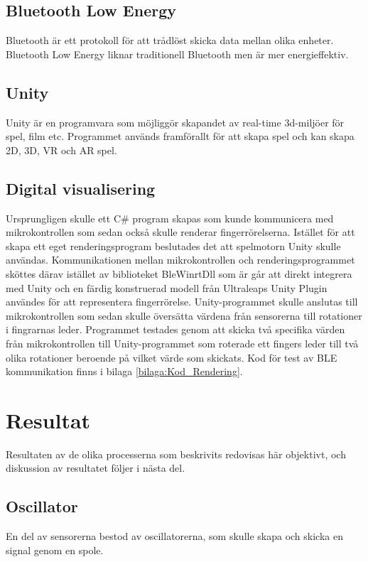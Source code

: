 \documentclass[a4paper]{article}
\begin{document}
\begin{sloppypar}
    \subsection{Bluetooth Low Energy}
    Bluetooth är ett protokoll för att trådlöst skicka data mellan olika enheter. Bluetooth Low Energy liknar traditionell Bluetooth men är mer energieffektiv.~\cite{Bluetooth}

    \subsection{Unity}
    Unity är en programvara som möjliggör skapandet av real-time 3d-miljöer för spel, film etc. Programmet används framförallt för att skapa spel och kan skapa 2D, 3D, VR och AR spel.~\cite{Unity}

    \subsection{Digital visualisering}
    Ursprungligen skulle ett C\# program skapas som kunde kommunicera med mikrokontrollen som sedan också skulle renderar fingerrörelserna.
    Istället för att skapa ett eget renderingsprogram beslutades det att spelmotorn Unity skulle användas.
    Kommunikationen mellan mikrokontrollen och renderingsprogrammet sköttes därav istället av biblioteket BleWinrtDll som är går att direkt integrera med Unity
    och en färdig konstruerad modell från Ultraleaps Unity Plugin användes för att representera fingerrörelse.
    Unity-programmet skulle anslutas till mikrokontrollen som sedan skulle översätta värdena från sensorerna till rotationer i fingrarnas leder.
    Programmet testades genom att skicka två specifika värden från mikrokontrollen till Unity-programmet som roterade ett fingers leder till två olika rotationer beroende på vilket värde som skickats.
    Kod för test av BLE kommunikation finns i bilaga \ref{bilaga:Kod_Rendering}.


    \newpage
    \section{Resultat}
    Resultaten av de olika processerna som beskrivits redovisas här objektivt, och diskussion av resultatet följer i nästa del.
    \subsection{Oscillator}
    En del av sensorerna bestod av oscillatorerna, som skulle skapa och skicka en signal genom en spole.

\end{sloppypar}
\end{document}
